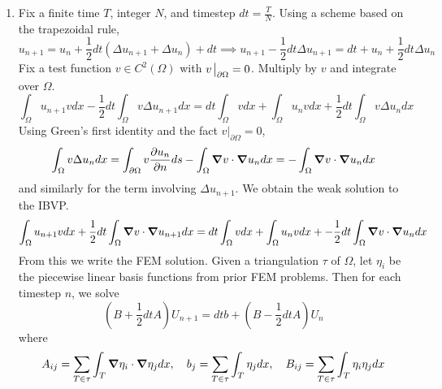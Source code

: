 \documentclass{article}
\newcommand{\imp}{\implies}
\newcommand{\ptl}{\partial}
\begin{document}
\begin{enumerate}[label=(\alph*)]
	
\item Fix a finite time $T$, integer $N$, and timestep $dt=\frac TN$. Using a scheme based on the trapezoidal rule,
$$u_{n+1} = u_n + \frac12dt(\Delta u_{n+1}+\Delta u_n) + dt
\imp u_{n+1} - \frac12dt\Delta u_{n+1} = dt + u_n + \frac12dt\Delta u_n$$
Fix a test function $v\in C^2(\Omega)$ with $v\eval_{\ptl\Omega}=0$. Multiply by $v$ and integrate over $\Omega$.
$$\int_\Omega u_{n+1}vdx - \frac12dt\int_\Omega v\Delta u_{n+1}dx = dt\int_\Omega vdx + \int_\Omega u_nvdx + \frac12dt\int_\Omega v\Delta u_ndx$$
Using Green's first identity and the fact $v|_{\ptl\Omega}=0$,
$$\int_\Omega v\Delta u_ndx = \int_{\ptl\Omega}v\pdv{u_n}{n}ds - \int_\Omega\grad v\cdot\grad u_ndx
= -\int_\Omega\grad v\cdot\grad u_ndx$$
and similarly for the term involving $\Delta u_{n+1}$. We obtain the weak solution to the IBVP.
$$\int_\Omega u_{n+1}vdx + \frac12dt\int_\Omega\grad v\cdot\grad u_{n+1}dx = dt\int_\Omega vdx + \int_\Omega u_nvdx + -\frac12dt\int_\Omega\grad v\cdot\grad u_ndx$$
From this we write the FEM solution. Given a triangulation $\tau$ of $\Omega$, let $\eta_i$ be the piecewise linear basis functions from prior FEM problems. Then for each timestep $n$, we solve 
$$(B+\frac12dtA)U_{n+1} = dtb + (B-\frac12dtA)U_n$$
where
$$A_{ij} = \sum_{T\in\tau}\int_T\grad\eta_i\cdot\grad\eta_jdx,
\quad b_j = \sum_{T\in\tau}\int_T\eta_jdx,
\quad B_{ij} = \sum_{T\in\tau}\int_T\eta_i\eta_jdx$$
	
\end{enumerate}


	
\end{document}
